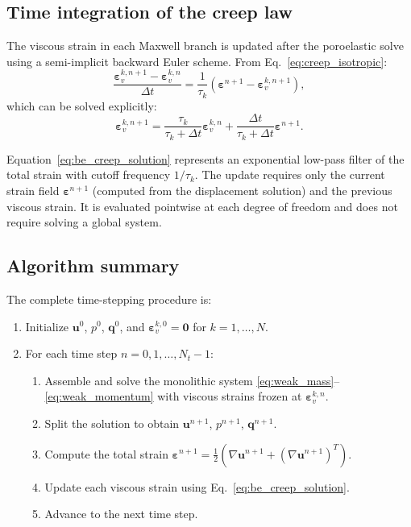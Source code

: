 \documentclass[a4paper,fleqn,longmktitle]{cas-sc}
\begin{document}
\subsection{Time integration of the creep law}
\label{sec:time_integration}

The viscous strain in each Maxwell branch is updated after the poroelastic
solve using a semi-implicit backward Euler scheme. From
Eq.~\eqref{eq:creep_isotropic}:
\begin{equation}
\frac{\bm{\varepsilon}_v^{k,n+1} - \bm{\varepsilon}_v^{k,n}}{\Delta t}
= \frac{1}{\tau_k} \left( \bm{\varepsilon}^{n+1} - \bm{\varepsilon}_v^{k,n+1} \right),
\label{eq:be_creep}
\end{equation}
which can be solved explicitly:
\begin{equation}
\bm{\varepsilon}_v^{k,n+1} =
\frac{\tau_k}{\tau_k + \Delta t} \bm{\varepsilon}_v^{k,n}
+ \frac{\Delta t}{\tau_k + \Delta t} \bm{\varepsilon}^{n+1}.
\label{eq:be_creep_solution}
\end{equation}

Equation~\eqref{eq:be_creep_solution} represents an exponential low-pass filter
of the total strain with cutoff frequency $1/\tau_k$. The update requires only
the current strain field $\bm{\varepsilon}^{n+1}$ (computed from the displacement
solution) and the previous viscous strain. It is evaluated pointwise at each
degree of freedom and does not require solving a global system.

\subsection{Algorithm summary}

The complete time-stepping procedure is:

\begin{enumerate}
  \item Initialize $\bm{u}^0$, $p^0$, $\bm{q}^0$, and $\bm{\varepsilon}_v^{k,0}
        = \bm{0}$ for $k = 1, \dots, N$.
  \item For each time step $n = 0, 1, \dots, N_t-1$:
  \begin{enumerate}
    \item Assemble and solve the monolithic system
          \eqref{eq:weak_mass}--\eqref{eq:weak_momentum} with viscous strains
          frozen at $\bm{\varepsilon}_v^{k,n}$.
    \item Split the solution to obtain $\bm{u}^{n+1}$, $p^{n+1}$, $\bm{q}^{n+1}$.
    \item Compute the total strain $\bm{\varepsilon}^{n+1} =
          \frac{1}{2}(\nabla\bm{u}^{n+1} + (\nabla\bm{u}^{n+1})^T)$.
    \item Update each viscous strain using Eq.~\eqref{eq:be_creep_solution}.
    \item Advance to the next time step.
  \end{enumerate}
\end{enumerate}
\end{document}
